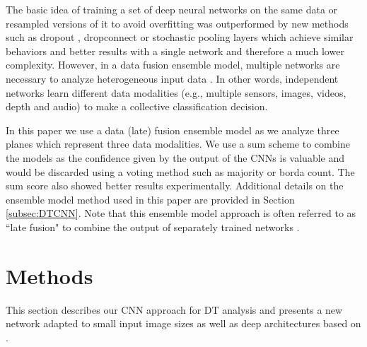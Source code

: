 \documentclass[a4paper,11pt]{article}
\begin{document}
The basic idea of training a set of deep neural networks on the same data or resampled versions of it to avoid overfitting was outperformed by new methods such as
dropout \cite{srivastava2014dropout}, dropconnect \cite{wan2013regularization} or stochastic pooling \cite{zeiler2013stochastic} layers
which achieve similar behaviors and better results with a single network and therefore a much lower complexity.
However, in a data fusion ensemble model, multiple networks are necessary to analyze heterogeneous input data \cite{ahmad2005combination,yim1995neural}.
In other words, independent networks learn different data modalities (e.g., multiple sensors, images, videos, depth and audio) to make a collective classification decision.

In this paper we use a data (late) fusion ensemble model as we analyze three planes which represent three data modalities.
We use a sum scheme to combine the models as the confidence given by the output of the CNNs is valuable and would be discarded using a voting method such as majority or borda count.
The sum score also showed better results experimentally. Additional details on the ensemble model method used in this paper are provided in Section \ref{subsec:DTCNN}.
Note that this ensemble model approach is often referred to as ``late fusion" to combine the output of separately trained networks \cite{karpathy2014large,simonyan2014two,shao2016slicing}.

\section{Methods}
\label{sec:Methods}
This section describes our CNN approach for DT analysis and presents a new network adapted to small input image sizes as well as deep architectures based on \cite{andrearczyk2016using}.
\end{document}
